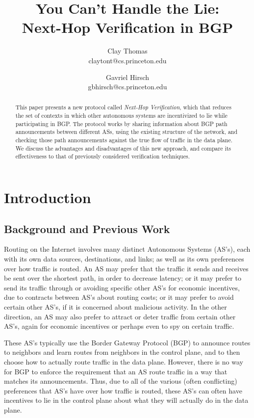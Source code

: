 \documentclass[10pt]{article}
\begin{document}

\title{
  You Can't Handle the Lie: \\
  Next-Hop Verification in BGP
}
\author{
  Clay Thomas\\ claytont@cs.princeton.edu
  \and 
  Gavriel Hirsch\\ gbhirsch@cs.princeton.edu 
}
\maketitle

\begin{abstract}
  This paper presents a new protocol called \emph{Next-Hop Verification},
  which that reduces the set of contexts in which
  other autonomous systems are incentivized to lie while participating in BGP.
  The protocol works by sharing information about BGP path announcements
  between different ASs, using the existing structure of the network,
  and checking those path announcements against the true flow of traffic
  in the data plane.
  We discuss the advantages and disadvantages of this new approach,
  and compare its effectiveness to that of previously considered verification
  techniques.
\end{abstract}


\section{Introduction}

  \subsection{Background and Previous Work}
    Routing on the Internet involves many distinct Autonomous Systems (AS's), each
    with its own data sources, destinations, and links; as well as its own
    preferences over how traffic is routed. An AS may prefer that the traffic it
    sends and receives be sent over the shortest path, in order to decrease
    latency; or it may prefer to send its traffic through or avoiding specific
    other AS's for economic incentives, due to contracts between AS's about
    routing costs; or it may prefer to avoid certain other AS's, if it is
    concerned about malicious activity. In the other direction, an AS may also
    prefer to attract or deter traffic from certain other AS's, again for economic
    incentives or perhaps even to spy on certain traffic.

    These AS's typically use the Border Gateway Protocol (BGP) to announce
    routes to neighbors and learn routes from neighbors in the control plane,
    and to then choose how to actually route traffic in the data plane. However,
    there is no way for BGP to enforce the requirement that an AS route traffic in a
    way that matches its announcements.
    Thus, due to all of the various (often conflicting)
    preferences that AS's have over how traffic is routed, these
    AS's can often have incentives to lie in the control plane about what they
    will actually do in the data plane.
\end{document}
